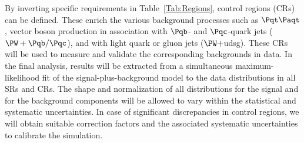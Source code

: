 \documentclass[a4paper,11pt]{article}
\newcommand{\Pb}{{{\Pqb}}\xspace}
\newcommand{\Pt}{{{\Pqt}}\xspace}
\newcommand{\Pc}{{{\Pqc}}\xspace}
\newcommand{\PAt}{{{{\Paqt}}}\xspace}
\begin{document}
By inverting specific requirements in  Table~\ref{Tab:Regions}, control regions (CRs) can be defined. 
These enrich the various background processes such as $\Pt\PAt$, vector boson production in association with $\Pb$- and $\Pc$-quark jets (${\PW}+\Pb/\Pc$), and with light quark or gluon jets (${\PW}+$udsg). 
These CRs will be used to measure and validate the corresponding backgrounds in data.
In the final analysis, results will be extracted from a simultaneous maximum-likelihood fit of the signal-plus-background model to the data distributions in all SRs and CRs. The shape and normalization of all distributions for the signal and for the background components will be allowed to vary within the statistical and systematic uncertainties. In case of significant discrepancies in control regions, we will obtain suitable correction factors and the associated systematic uncertainties to calibrate the simulation.
\end{document}
